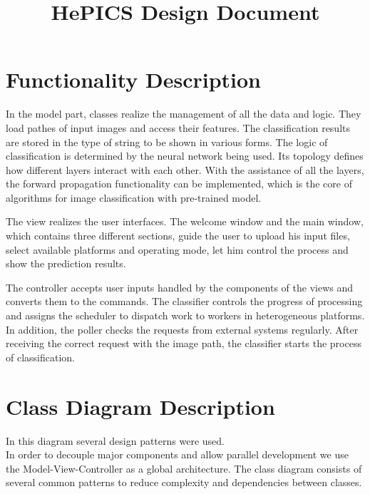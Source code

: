 \documentclass[parskip=full]{scrartcl}
\title{HePICS Design Document}
\begin{document}
\maketitle
\thispagestyle{empty}
\pagebreak





\tableofcontents
\pagebreak





\section {Functionality Description}

In the model part, classes realize the management of all the data and logic. They load pathes of input images and access their features. The classification results are stored in the type of string to be shown in various forms. The logic of classification is determined by the neural network being used. Its topology defines how different layers interact with each other. With the assistance of all the layers, the forward propagation functionality can be implemented, which is the core of algorithms for image classification with pre-trained model.

The view realizes the user interfaces. The welcome window and the main window, which contains three different sections, guide the user to upload his input files, select available platforms and operating mode, let him control the process and show the prediction results. 

The controller accepts user inputs handled by the components of the views and converts them to the commands. The classifier controls the progress of processing and assigns the scheduler to dispatch work to workers in heterogeneous platforms. In addition, the poller checks the requests from external systems regularly. After receiving the correct request with the image path, the classifier starts the process of classification.



\pagebreak


\section {Class Diagram Description}

In this diagram several design patterns were used.\\
In order to decouple  major components and allow parallel development we use the Model-View-Controller as a global architecture.
The class diagram consists of several common patterns to reduce complexity and dependencies between classes.
\end{document}
